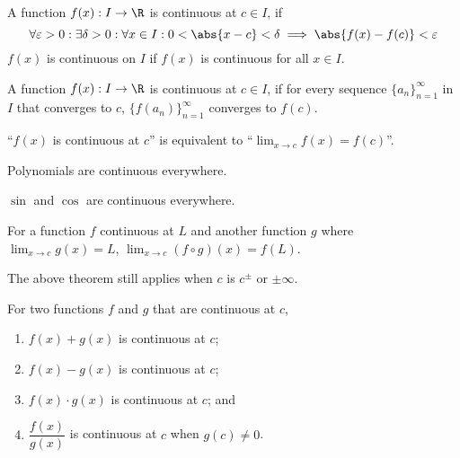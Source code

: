 \documentclass{article}
\begin{document}
%
\begin{definition}
    A function \(f(x):I\to\R\) is continuous at \(c \in I\), if
    \begin{equation*}
        \forall\varepsilon>0: \exists\delta>0: \forall x\in I:0<\abs{x-c}<\delta \implies \abs{f(x)-f(c)}<\varepsilon
    \end{equation*}
    \(f(x)\) is continuous on \(I\) if \(f(x)\) is continuous for all \(x \in I\).
\end{definition}
%
\begin{definition}
    A function \(f(x):I\to\R\) is continuous at \(c \in I\), if
    for every sequence \(\{a_n\}^{\infty}_{n=1}\) in \(I\) that converges to \(c\),
    \(\{f(a_n)\}^{\infty}_{n=1}\) converges to \(f(c)\).
\end{definition}
%
\begin{note}
    ``\(f(x)\) is continuous at \(c\)'' is equivalent to
    ``\(\displaystyle \lim_{x\to c} f(x) = f(c)\)''.
\end{note}
%
\begin{note}
    Polynomials are continuous everywhere.
\end{note}
%
\begin{note}
    \(\sin\) and \(\cos\) are continuous everywhere.
\end{note}
%
\begin{theorem}
    For a function \(f\) continuous at \(L\)
    and another function \(g\) where \(\displaystyle \lim_{x\to c}g(x) = L\),
    \(\displaystyle \lim_{x\to c} (f \circ g)(x) = f(L)\).
\end{theorem}
\begin{note}
    The above theorem still applies when \(c\) is \(c^\pm\) or \(\pm\infty\).
\end{note}
%
\begin{theorem}
    For two functions \(f\) and \(g\) that are continuous at \(c\),
    \begin{enumerate}[label=\normalfont\alph*)] %
        \item \(f(x) + g(x)\) is continuous at \(c\);
        \item \(f(x) - g(x)\) is continuous at \(c\);
        \item \(f(x) \cdot g(x)\) is continuous at \(c\); and
        \item \(\dfrac{f(x)}{g(x)}\) is continuous at \(c\) when \(g(c)\ne0\).
    \end{enumerate}
\end{theorem}
\end{document}

